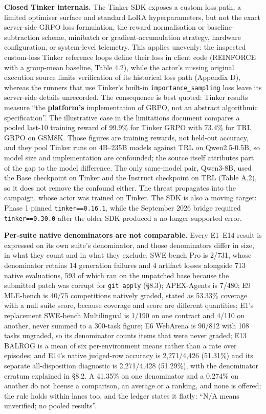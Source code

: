 \documentclass[12pt,a4paper]{report}
\begin{document}
\textbf{Closed Tinker internals.} The Tinker SDK exposes a custom loss
path, a limited optimiser surface and standard LoRA hyperparameters, but
not the exact server-side GRPO loss formulation, the reward
normalisation or baseline-subtraction scheme, minibatch or
gradient-accumulation strategy, hardware configuration, or system-level
telemetry. This applies unevenly: the inspected custom-loss Tinker
reference loops define their loss in client code (REINFORCE with a
group-mean baseline, Table 4.2), while the actor's missing original
execution source limits verification of its historical loss path
(Appendix D), whereas the runners that use Tinker's built-in
\texttt{importance\_sampling} loss leave its server-side details
unrecorded. The consequence is best quoted: Tinker results measure ``the
\textbf{platform's} implementation of GRPO, not an abstract algorithmic
specification''. The illustrative case in the limitations document
compares a pooled last-10 training reward of 99.9\% for Tinker GRPO with
73.4\% for TRL GRPO on GSM8K. Those figures are training rewards, not
held-out accuracy, and they pool Tinker runs on 4B--235B models against
TRL on Qwen2.5-0.5B, so model size and implementation are confounded;
the source itself attributes part of the gap to the model difference.
The only same-model pair, Qwen3-8B, used the Base checkpoint on Tinker
and the Instruct checkpoint on TRL (Table A.2), so it does not remove
the confound either. The threat propagates into the campaign, whose
actor was trained on Tinker. The SDK is also a moving target: Phase 1
pinned \texttt{tinker==0.16.1}, while the September 2026 bridge required
\texttt{tinker==0.30.0} after the older SDK produced a
no-longer-supported error.

\textbf{Per-suite native denominators are not comparable.} Every E1--E14
result is expressed on its own suite's denominator, and those
denominators differ in size, in what they count and in what they
exclude. SWE-bench Pro is 2/731, whose denominator retains 14 generation
failures and 4 artifact losses alongside 713 native evaluations, 593 of
which ran on the unpatched base because the submitted patch was corrupt
for \texttt{git\ apply} (§8.3); APEX-Agents is 7/480; E9 MLE-bench is
40/75 competitions natively graded, stated as 53.33\% coverage with a
null suite score, because coverage and score are different quantities;
E1's replacement SWE-bench Multilingual is 1/190 on one contract and
4/110 on another, never summed to a 300-task figure; E6 WebArena is
90/812 with 108 tasks ungraded, so its denominator counts items that
were never graded; E13 BALROG is a mean of six per-environment means
rather than a rate over episodes; and E14's native judged-row accuracy
is 2,271/4,426 (51.31\%) and its separate all-disposition diagnostic is
2,271/4,428 (51.29\%), with the denominator erratum explained in §8.2. A
41.35\% on one denominator and a 0.274\% on another do not license a
comparison, an average or a ranking, and none is offered; the rule holds
within lanes too, and the ledger states it flatly: ``N/A means
unverified; no pooled results''.
\end{document}
